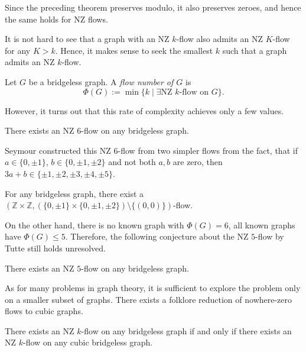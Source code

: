 \begin{remark}
Since the preceding theorem preserves modulo, it also preserves zeroes, and hence the same holds for NZ flows.
\end{remark}

It is not hard to see that a graph with an NZ $k$-flow also admits an NZ $K$-flow for any $K>k$. Hence, it makes sense to seek the smallest $k$ such that a graph admits an NZ $k$-flow.

\begin{definition}
Let $G$ be a bridgeless graph. A \emph{flow number of $G$} is
\begin{equation*}
\Phi(G) := \min\{k\mid\exists\text{NZ } k\text{-flow on }G\}.\label{eq:flow_number}
\end{equation*}
\end{definition}

However, it turns out that this rate of complexity achieves only a few values.

\begin{theorem} \emph{\cite[p. 133]{seymour}}
There exists an NZ $6$-flow on any bridgeless graph.\label{th:6_flow}
\end{theorem}

Seymour constructed this NZ $6$-flow from two simpler flows from the fact, that if $a\in\{0,\pm 1\}$, $b\in\{0,\pm 1,\pm 2\}$ and not both $a, b$ are zero, then $3a+b\in\{\pm 1, \pm 2, \pm 3, \pm 4, \pm 5\}$.

\begin{lemma} \emph{\cite[p. 132]{seymour}}
For any bridgeless graph, there exist a $(\mathbb Z\times\mathbb Z, (\{0,\pm 1\}\times\{0, \pm 1, \pm 2\})\setminus\{(0, 0)\})$-flow. \label{lem:2_flow_3_flow_seymour}
\end{lemma}

On the other hand, there is no known graph with $\Phi(G)=6$, all known graphs have $\Phi(G)\leq 5$. Therefore, the following conjecture about the NZ $5$-flow by Tutte still holds unresolved.

\begin{conjecture} \emph{\cite[p. 83]{tutte}}
There exists an NZ $5$-flow on any bridgeless graph.\label{conj:5_flow}
\end{conjecture}

As for many problems in graph theory, it is sufficient to explore the problem only on a smaller subset of graphs. There exists a folklore reduction of nowhere-zero flows to cubic graphs.
\begin{proposition}
There exists an NZ $k$-flow on any bridgeless graph if and only if there exists an NZ $k$-flow on any cubic bridgeless graph.\label{prop:reduction}
\end{proposition}

